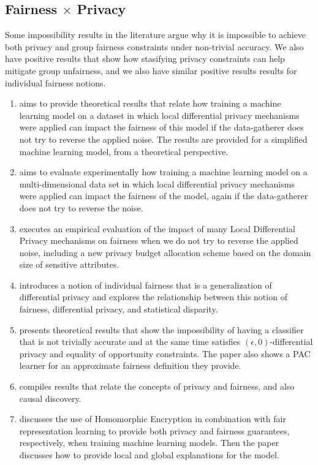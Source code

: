 \subsection{Fairness $\times$ Privacy}

Some impossibility results in the literature argue why it is impossible to achieve both privacy and group fairness constraints under non-trivial accuracy\cite{Rachel}. We also have positive results that show how stasifying privacy constraints can help mitigate group unfairness\cite{makhlouf2024systematicformalstudyimpact}\cite{makhlouf2024impact}\cite{arcolezi2023local}, and we also have similar positive results results for individual fairness notions\cite{Awareness}.

\begin{enumerate}
\item \cite{makhlouf2024systematicformalstudyimpact} aims to provide theoretical results that relate how training a machine learning model on a dataset in which local differential privacy mechanisms were applied can impact the fairness of this model if the data-gatherer does not try to reverse the applied noise. The results are provided for a simplified machine learning model, from a theoretical perspective.
\item \cite{makhlouf2024impact} aims to evaluate experimentally how training a machine learning model on a multi-dimensional data set in which local differential privacy mechanisms were applied can impact the fairness of the model, again if the data-gatherer does not try to reverse the noise.
\item \cite{arcolezi2023local} executes an empirical evaluation of the impact of many Local Differential Privacy mechanisms on fairness when we do not try to reverse the applied noise, including a new privacy budget allocation scheme based on the domain size of sensitive attributes.
\item \cite{Awareness} introduces a notion of individual fairness that is a generalization of differential privacy and explores the relationship between this notion of fairness, differential privacy, and statistical disparity.
\item \cite{Rachel} presents theoretical results that show the impossibility of having a classifier that is not trivially accurate and at the same time satisfies $(\epsilon,0)$-differential privacy and equality of opportunity constraints. The paper also shows a PAC learner for an approximate fairness definition they provide.
\item \cite{henao2023exploring} compiles results that relate the concepts of privacy and fairness, and also causal discovery.
\item \cite{franco2021toward} discusses the use of Homomorphic Encryption in combination with fair representation learning \cite{zemel2013learning} to provide both privacy and fairness guarantees, respectively, when training machine learning models. Then the paper discusses how to provide local and global explanations for the model.
\end{enumerate}

